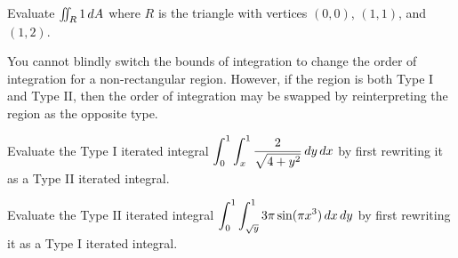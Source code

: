 \documentclass[letterpaper, twoside, 12pt]{book}
\begin{document}
          \begin{contributors}

          \end{contributors}

          \begin{problem}
            Evaluate $\iint_R 1 \,d{A}$
            where $R$ is the triangle with vertices $(0,0)$,
            $(1,1)$, and $(1,2)$.
          \end{problem}

          \begin{solution}

          \end{solution}

          \begin{contributors}

          \end{contributors}

\begin{remark}
  You cannot blindly switch the bounds of integration to change
  the order of integration for a non-rectangular
  region. However, if the region is both Type I and Type II, then the
  order of integration may be swapped by reinterpreting the region
  as the opposite type.
\end{remark}

          \begin{problem}
            Evaluate the Type I iterated integral
            $\displaystyle\int_0^1\int_x^1 \frac{2}{\sqrt{4+y^2}}\,d{y}\,d{x}$
            by first rewriting it as a Type II iterated integral.
          \end{problem}

          \begin{solution}

          \end{solution}

          \begin{contributors}

          \end{contributors}

          \begin{problem}
            Evaluate the Type II iterated integral
            $\displaystyle\int_0^1\int_{\sqrt{y}}^1 3\pi \sin(\pi x^3)\,d{x}\,d{y}$
            by first rewriting it as a Type I iterated integral.
          \end{problem}

          \begin{solution}

          \end{solution}
\end{document}
